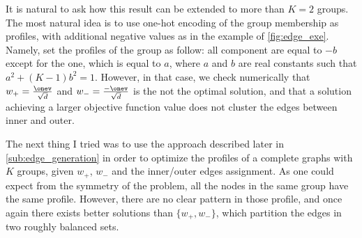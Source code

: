 \begin{aside}
  It is natural to ask how this result can be extended to more than $K=2$ groups. The most natural
  idea is to use one-hot encoding of the group membership as profiles, with additional negative
  values as in the example of \autoref{fig:edge_exe}. Namely, set the profiles of the \ith{} group
  as follow: all component are equal to $-b$ except for the \ith{} one, which is equal to $a$, where
  $a$ and $b$ are real constants such that $a^2 + (K-1)b^2=1$. However, in that case, we check
  numerically that $w_+ = \frac{\onev}{\sqrt{d}}$ and $w_- = \frac{-\onev}{\sqrt{d}}$ is the not the
  optimal solution, and that a solution achieving a larger objective function value does not cluster
  the edges between inner and outer.

  The next thing I tried was to use the approach described later in \autoref{sub:edge_generation} in
  order to optimize the profiles of a complete graphs with $K$ groups, given $w_+$, $w_-$ and the
  inner/outer edges assignment. As one could expect from the symmetry of the problem, all the nodes
  in the same group have the same profile. However, there are no clear pattern in those profile, and
  once again there exists better solutions than $\{w_+, w_-\}$, which partition the edges in two
  roughly balanced sets.
\end{aside}

